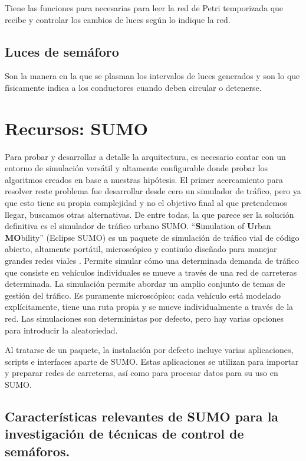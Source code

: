 Tiene las funciones para necesarias para leer la red de Petri
temporizada que recibe y controlar los cambios de luces según lo indique
la red.

\hypertarget{luces-de-semuxe1foro}{%
\subsection{Luces de semáforo}\label{luces-de-semuxe1foro}}

Son la manera en la que se plasman los intervalos de luces generados y
son lo que físicamente indica a los conductores cuando deben circular o
detenerse.

\hypertarget{recursos-sumo}{%
\section{Recursos: SUMO}\label{recursos-sumo}}

Para probar y desarrollar a detalle la arquitectura, es necesario contar
con un entorno de simulación versátil y altamente configurable donde
probar los algoritmos creados en base a nuestras hipótesis. El primer
acercamiento para resolver reste problema fue desarrollar desde cero un
simulador de tráfico, pero ya que esto tiene su propia complejidad y no
el objetivo final al que pretendemos llegar, buscamos otras
alternativas. De entre todas, la que parece ser la solución definitiva
es el simulador de tráfico urbano SUMO. ``\textbf{S}imulation of
\textbf{U}rban \textbf{MO}bility'' (Eclipse SUMO) es un paquete de
simulación de tráfico vial de código abierto, altamente portátil,
microscópico y continúo diseñado para manejar grandes redes viales
\textcite{SUMO2018}. Permite simular cómo una determinada demanda de
tráfico que consiste en vehículos individuales se mueve a través de una
red de carreteras determinada. La simulación permite abordar un amplio
conjunto de temas de gestión del tráfico. Es puramente microscópico:
cada vehículo está modelado explícitamente, tiene una ruta propia y se
mueve individualmente a través de la red. Las simulaciones son
deterministas por defecto, pero hay varias opciones para introducir la
aleatoriedad.

Al tratarse de un paquete, la instalación por defecto incluye varias
aplicaciones, scripts e interfaces aparte de SUMO. Estas aplicaciones se
utilizan para importar y preparar redes de carreteras, así como para
procesar datos para su uso en SUMO.

\hypertarget{caracteruxedsticas-relevantes-de-sumo-para-la-investigaciuxf3n-de-tuxe9cnicas-de-control-de-semuxe1foros.}{%
\subsection{Características relevantes de SUMO para la investigación de
técnicas de control de
semáforos.}\label{caracteruxedsticas-relevantes-de-sumo-para-la-investigaciuxf3n-de-tuxe9cnicas-de-control-de-semuxe1foros.}}

